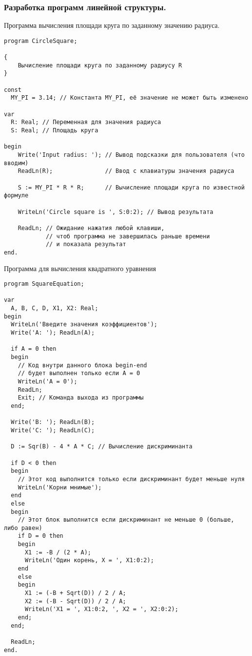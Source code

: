 \documentclass[12pt,a4paper]{report}
\begin{document}
\subsubsection*{Разработка программ линейной структуры.}
Программа вычисления площади круга по заданному значению радиуса. 
\begin{verbatim}
program CircleSquare;

{
    Вычисление площади круга по заданному радиусу R
}

const
  MY_PI = 3.14; // Константа MY_PI, её значение не может быть изменено

var
  R: Real; // Переменная для значения радиуса
  S: Real; // Площадь круга

begin
    Write('Input radius: '); // Вывод подсказки для пользователя (что вводим)
    ReadLn(R);               // Ввод с клавиатуры значения радиуса 

    S := MY_PI * R * R;      // Вычисление площади круга по известной формуле

    WriteLn('Circle square is ', S:0:2); // Вывод результата

    ReadLn; // Ожидание нажатия любой клавиши,
            // чтоб программа не завершилась раньше времени
            // и показала результат
end.
\end{verbatim}


\clearpage
Программа для вычисления квадратного уравнения
\begin{verbatim}
program SquareEquation;

var
  A, B, C, D, X1, X2: Real;
begin
  WriteLn('Введите значения коэффициентов');
  Write('A: '); ReadLn(A);
  
  if A = 0 then
  begin
    // Код внутри данного блока begin-end
    // будет выполнен только если A = 0
    WriteLn('A = 0');
    ReadLn;
    Exit; // Команда выхода из программы
  end;
  
  Write('B: '); ReadLn(B);
  Write('C: '); ReadLn(C);

  D := Sqr(B) - 4 * A * C; // Вычисление дискриминанта

  if D < 0 then
  begin
    // Этот код выполнится только если дискриминант будет меньше нуля
    WriteLn('Корни мнимые');
  end
  else
  begin
    // Этот блок выполнится если дискриминант не меньше 0 (больше, либо равен)
    if D = 0 then
    begin
      X1 := -B / (2 * A);
      WriteLn('Один корень, X = ', X1:0:2);
    end
    else
    begin
      X1 := (-B + Sqrt(D)) / 2 / A;
      X2 := (-B - Sqrt(D)) / 2 / A;
      WriteLn('X1 = ', X1:0:2, ', X2 = ', X2:0:2);
    end;
  end;

  ReadLn;
end.
\end{verbatim}
\end{document}
